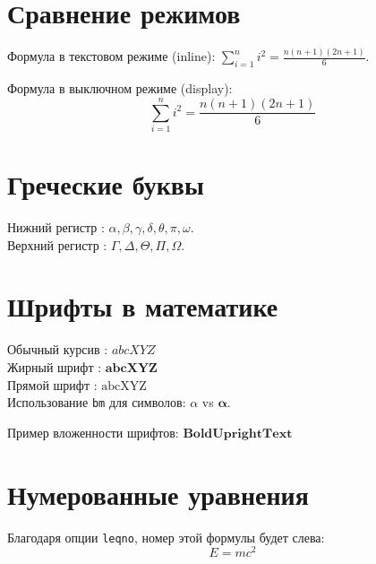 \documentclass[a4paper, 12pt, fleqn, leqno]{article}
\begin{document}
	
	\section*{Сравнение режимов}
	Формула в текстовом режиме (inline): $\sum_{i=1}^{n} i^2 = \frac{n(n+1)(2n+1)}{6}$. 
	
	Формула в выключном режиме (display):	
	\[
	\sum_{i=1}^{n} i^2 = \frac{n(n+1)(2n+1)}{6}
	\]
	
	\section*{Греческие буквы}
	Нижний регистр : $\alpha, \beta, \gamma, \delta, \theta, \pi, \omega$. \\
	Верхний регистр : $\Gamma, \Delta, \Theta, \Pi, \Omega$.
	
	\section*{Шрифты в математике}
	Обычный курсив : $abcXYZ$ \\
	Жирный шрифт : $\mathbf{abcXYZ}$ \\
	Прямой шрифт : $\mathrm{abcXYZ}$ \\
	Использование \texttt{bm} для символов: $\alpha$ vs $\bm{\alpha}$.
	
	Пример вложенности шрифтов: $\mathrm{\mathbf{BoldUprightText}}$
	
	\section*{Нумерованные уравнения}
	Благодаря опции \texttt{leqno}, номер этой формулы будет слева:
	\begin{equation}
		E = mc^2
	\end{equation}
	
\end{document}
